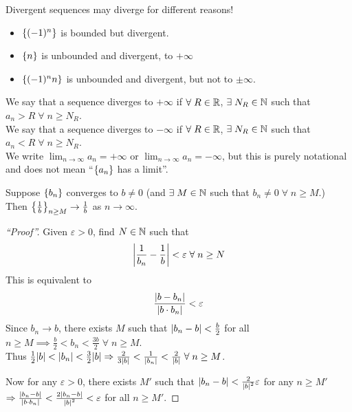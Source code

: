 \documentclass[12pt]{article}
\begin{document}
\begin{rem}[Warning!]
    Divergent sequences may diverge for different reasons!
    \begin{itemize}
        \item $\set{(-1)^{n}}$ is bounded but divergent.
        \item $\set{n}$ is unbounded and divergent, to $+\infty$
        \item $\set{(-1)^{n}n}$ is unbounded and divergent, but not to $\pm \infty$.
    \end{itemize}
\end{rem}
\begin{defn} \label{defn:diverging to infinity}
    We say that a sequence diverges to $+\infty$ if $\forall\; R \in \mathbb{R}$, $\exists\; N_{R} \in \mathbb{N}$ such that $a_{n} > R \;\forall\; n \geq N_{R}$. \\
    We say that a sequence diverges to $-\infty$ if $\forall\; R \in \mathbb{R}$, $\exists\; N_{R} \in \mathbb{N}$ such that $a_{n} < R \;\forall\; n \geq N_{R}$. \\
    We write $\lim_{n \to \infty} a_{n} = +\infty$ or $\lim_{n \to \infty} a_{n} = -\infty$, but this is purely notational and does not mean ``$\set{a_{n}}$ has a limit''.
\end{defn}

\begin{thm} \label{thm:}
    Suppose $\set{b_{n}}$ converges to $b \neq 0$ (and $\exists\; M \in \mathbb{N}$ such that $b_{n} \neq 0 \;\forall\; n \geq M$.) \\
    Then $\set{ \frac{1}{b} }_{n \geq M} \to \frac{1}{b}$ as $n \to \infty$.
\end{thm}
\begin{proof}[``Proof'']
    Given $\varepsilon > 0$, find $N \in \mathbb{N}$ such that \[
        \abs{ \frac{1}{b_{n}} - \frac{1}{b} } < \varepsilon \;\forall\; n \geq N
    \] 
    This is equivalent to \[
        \frac{\abs{ b - b_{n} }}{\abs{ b \cdot b_{n} } } < \varepsilon
    \]
    Since $b_{n} \to b$, there exists $M$ such that $\abs{ b_{n} - b } < \frac{b}{2}$ for all $n \geq M \implies \frac{b}{2} < b_{n} < \frac{3b}{2} \;\forall\; n \geq M$. \\
    Thus $\frac{1}{2}\abs{ b } < \abs{ b_{n} } < \frac{3}{2}\abs{ b } \implies \frac{2}{3\abs{ b }} < \frac{1}{\abs{ b_{n} }} < \frac{2}{\abs{ b }} \;\forall\; n \geq M$.

    Now for any $\varepsilon > 0$, there exists $M'$ such that $\abs{ b_{n} - b } <  \frac{2}{\abs{ b }^{2}} \varepsilon$ for any $n \geq M'$ \\
    $\implies \frac{\abs{ b_{n} - b }}{\abs{ b \cdot b_{n}}} < \frac{2 \abs{ b_{n} - b }}{\abs{ b}^{2}} < \varepsilon$ for all $n \geq M'$.
\end{proof}
\end{document}
